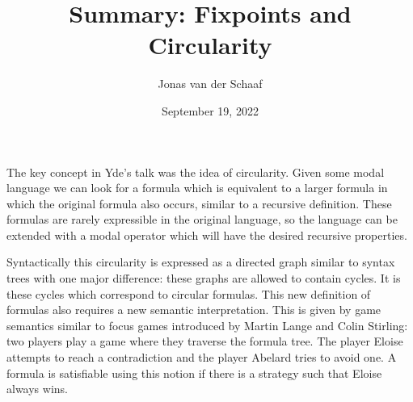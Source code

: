 \documentclass{article}
\title{Summary: Fixpoints and Circularity}
\date{September 19, 2022}
\author{Jonas van der Schaaf}
\begin{document}
\maketitle

The key concept in Yde's talk was the idea of circularity. Given some modal
language we can look for a formula which is equivalent to a larger formula in
which the original formula also occurs, similar to a recursive definition. These
formulas are rarely expressible in the original language, so the language can be
extended with a modal operator which will have the desired recursive properties.

Syntactically this circularity is expressed as a directed graph similar to
syntax trees with one major difference: these graphs are allowed to contain
cycles. It is these cycles which correspond to circular formulas. This new
definition of formulas also requires a new semantic interpretation. This is
given by game semantics similar to focus games introduced by Martin Lange and
Colin Stirling: two players play a game where they traverse the formula tree.
The player Eloise attempts to reach a contradiction and the player Abelard tries
to avoid one. A formula is satisfiable using this notion if there is a strategy
such that Eloise always wins.
\end{document}
